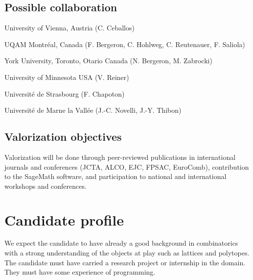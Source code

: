 \documentclass[a4paper,12pt]{article}
\begin{document}
\subsection{Possible collaboration}

\begin{compactitem}
\item University of Vienna, Austria (C. Ceballos)
\item UQAM Montréal, Canada (F. Bergeron, C. Hohlweg, C. Reutenauer, F. Saliola)
\item York University, Toronto, Otario Canada (N. Bergeron, M. Zabrocki)
\item University of Minnesota USA (V. Reiner)
\item Université de Strasbourg (F. Chapoton)
\item Université de Marne la Vallée (J.-C. Novelli, J.-Y. Thibon)
\end{compactitem}

\subsection{Valorization objectives}

Valorization will be done through peer-reviewed publications in international journals and conferences (JCTA, ALCO, EJC, FPSAC, EuroComb), contribution to the SageMath software, and participation to national and international workshops and conferences.

\section{Candidate profile}

We expect the candidate to have already a good background in combinatorics with a strong understanding of the objects at play such as lattices and polytopes. The candidate must have carried a research project or internship in the domain. They must have some experience of programming.


\small
\renewcommand{\refname}{\normalsize Bibliography}

\normalsize
\end{document}
